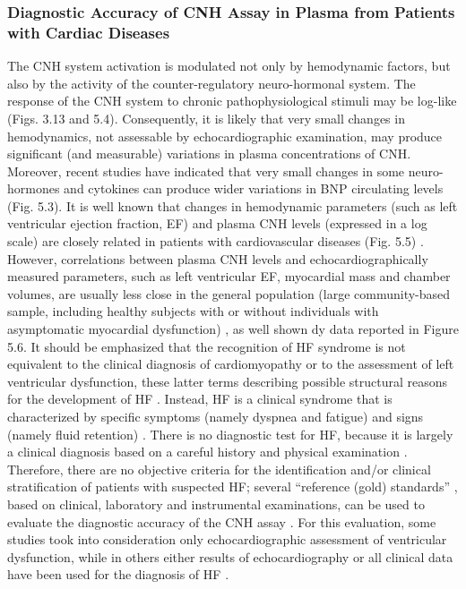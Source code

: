 \documentclass[14pt,a4paper,onecolumn]{extarticle}
\begin{document}
\subsubsection{ Diagnostic Accuracy of CNH Assay in Plasma from Patients with Cardiac Diseases}

The CNH system activation is modulated not only by hemodynamic factors, but also by
the activity of the counter-regulatory neuro-hormonal system. The response of the
CNH system to chronic pathophysiological stimuli may be log-like (Figs. 3.13 and 5.4).
Consequently, it is likely that very small changes in hemodynamics, not assessable by
echocardiographic examination, may produce significant (and measurable) variations
in plasma concentrations of CNH. Moreover, recent studies have indicated that very
small changes in some neuro-hormones and cytokines can produce wider variations in
BNP circulating levels \citep{bib360} (Fig. 5.3).
It is well known that changes in hemodynamic parameters (such as left ventricular
ejection fraction, EF) and plasma CNH levels (expressed in a log scale) are closely related in patients with cardiovascular diseases (Fig. 5.5) \citep{bib32} \citep{bib33} \citep{bib34} \citep{bib35} \citep{bib319} \citep{bib358} \citep{bib359} \citep{bib360} \citep{bib361} \citep{bib362} \citep{bib363} \citep{bib364} \citep{bib365}. However, correlations between plasma CNH levels and echocardiographically measured parameters,
such as left ventricular EF, myocardial mass and chamber volumes, are usually less close
in the general population (large community-based sample, including healthy subjects
with or without individuals with asymptomatic myocardial dysfunction) \citep{bib38} \citep{bib39} \citep{bib366} \citep{bib367},
as well shown dy data reported in Figure 5.6.
It should be emphasized that the recognition of HF syndrome is not equivalent to the
clinical diagnosis of cardiomyopathy or to the assessment of left ventricular dysfunction, these latter terms describing possible structural reasons for the development of HF
\citep{bib368} \citep{bib369} \citep{bib370}. Instead, HF is a clinical syndrome that is characterized by specific symptoms
(namely dyspnea and fatigue) and signs (namely fluid retention) \citep{bib368}. There is no diagnostic test for HF, because it is largely a clinical diagnosis based on a careful history
and physical examination \citep{bib368}. Therefore, there are no objective criteria for the identification and/or clinical stratification of patients with suspected HF; several “reference
(gold) standards” \citep{bib371}, based on clinical, laboratory and instrumental examinations,
can be used to evaluate the diagnostic accuracy of the CNH assay \citep{bib35}. For this evaluation, some studies took into consideration only echocardiographic assessment of ventricular dysfunction, while in others either results of echocardiography or all clinical data
have been used for the diagnosis of HF \citep{bib35} \citep{bib372}.
\end{document}
